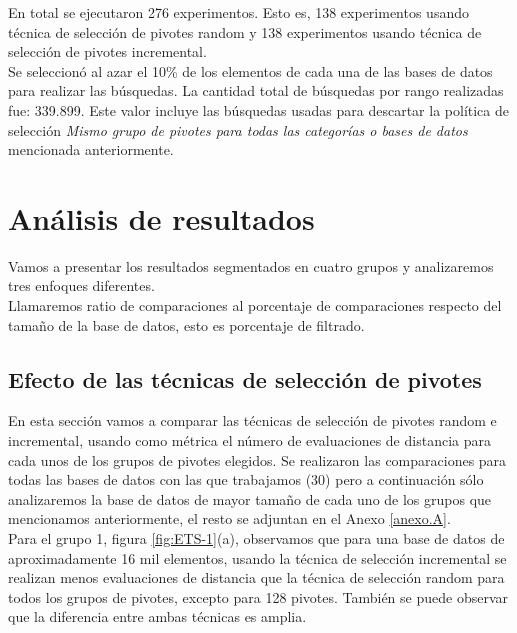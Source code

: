 En total se ejecutaron 276 experimentos. Esto es, 138 experimentos usando t\'ecnica de selecci\'on de pivotes random y 138 experimentos usando t\'ecnica de selecci\'on de pivotes incremental.\\

Se seleccion\'o al azar el 10\% de los elementos de cada una de las bases de datos para realizar las b\'usquedas. La cantidad total de b\'usquedas por rango realizadas fue: 339.899. Este valor incluye las b\'usquedas usadas para descartar la pol\'itica de selecci\'on \textit{Mismo grupo de pivotes para todas las categor\'ias o bases de datos} mencionada anteriormente.\\

\section{An\'alisis de resultados}

Vamos a presentar los resultados segmentados en cuatro grupos y analizaremos tres enfoques diferentes.\\

Llamaremos ratio de comparaciones al porcentaje de comparaciones respecto del tamaño de la base de datos, esto es porcentaje de filtrado.\\

\subsection{Efecto de las t\'ecnicas de selecci\'on de pivotes}

En esta secci\'on vamos a comparar las t\'ecnicas de selecci\'on de pivotes random e incremental, usando como m\'etrica el n\'umero de evaluaciones de distancia para cada unos de los grupos de pivotes elegidos. Se realizaron las comparaciones para todas las bases de datos con las que trabajamos (30) pero a continuaci\'on s\'olo analizaremos la base de datos de mayor tama\~no de cada uno de los grupos que mencionamos anteriormente, el resto se adjuntan en el Anexo \ref{anexo.A}.\\

Para el grupo 1, figura \ref{fig:ETS-1}(a), observamos que para una base de datos de aproximadamente 16 mil elementos,  usando la t\'ecnica de selecci\'on incremental se realizan menos evaluaciones de distancia que la t\'ecnica de selecci\'on random para todos los grupos de pivotes, excepto para 128 pivotes. Tambi\'en se puede observar que la diferencia entre ambas t\'ecnicas es amplia.\\

